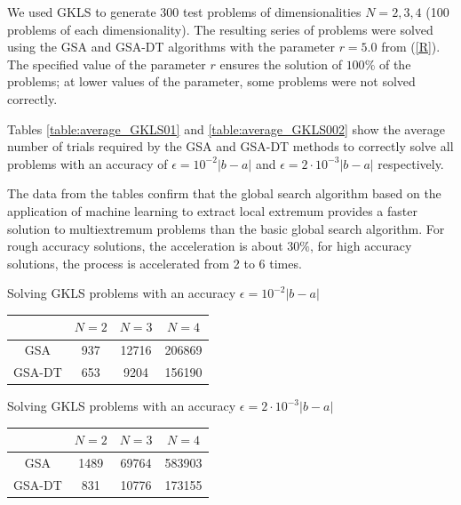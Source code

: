 \documentclass[entropy,article,submit,moreauthors,pdftex]{Definitions/mdpi}
\begin{document}
We used GKLS to generate 300 test problems of dimensionalities $N=2,3,4$ (100 problems of each dimensionality).
The resulting series of problems were solved using the GSA and GSA-DT algorithms with the parameter $r=5.0$ from (\ref{R}). The specified value of the parameter $r$ ensures the solution of  $100\%$ of the problems; at lower values of the parameter, some problems were not solved correctly.

Tables \ref{table:average_GKLS01} and \ref{table:average_GKLS002} show the average number of trials required by the GSA and GSA-DT methods to correctly solve all problems with an accuracy of $\epsilon = 10^{-2}\left|b-a\right|$ and $\epsilon = 2 \cdot 10^{-3}\left|b-a\right|$ respectively.

The data from the tables confirm that the global search algorithm based on the application of machine learning to extract local extremum provides a faster solution to multiextremum problems than the basic global search algorithm. For rough accuracy solutions, the acceleration is about  $30\%$, for high accuracy solutions, the process is accelerated from 2 to 6 times.

\begin{specialtable}[H] 
	\caption{Solving GKLS problems with an accuracy  $\epsilon = 10^{-2}\left|b-a\right|$}\label{table:average_GKLS01}
	\center
\begin{tabular}{cccc}
\toprule
        & $N=2$ & $N=3$  & $N=4$    \\
\midrule
GSA     &  937  &  12716 &  206869  \\
GSA-DT  &  653  &  9204  &  156190  \\
\bottomrule
\end{tabular}
\end{specialtable}

\begin{specialtable}[H] 
	\caption{Solving GKLS problems with an accuracy $\epsilon = 2 \cdot 10^{-3}\left|b-a\right|$}\label{table:average_GKLS002}
	\center
\begin{tabular}{cccc}
\toprule

       & $N=2$ & $N=3$  & $N=4$    \\
\midrule
GSA    & 1489  & 69764  & 583903  \\
GSA-DT & 831   & 10776  & 173155   \\
\bottomrule
\end{tabular}
\end{specialtable}
\end{document}
